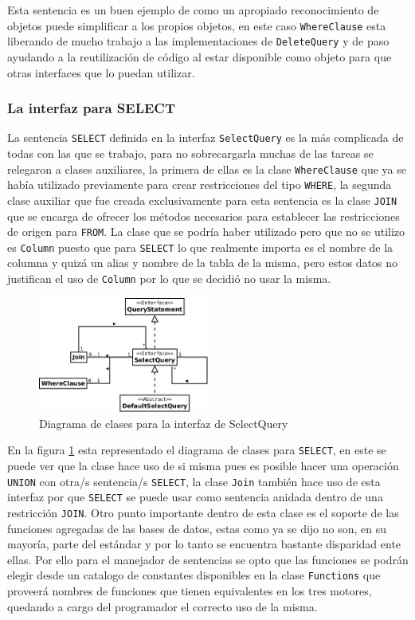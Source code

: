 Esta sentencia es un buen ejemplo de como un apropiado reconocimiento de objetos puede simplificar a los propios objetos, en este caso \verb=WhereClause= esta liberando de mucho trabajo a las implementaciones de \verb=DeleteQuery= y de paso ayudando a la reutilización de código al estar disponible como objeto para que otras interfaces que lo puedan utilizar.
%
\subsubsection{La interfaz para SELECT}
La sentencia \verb=SELECT= definida en la interfaz \verb=SelectQuery= es la más complicada de todas con las que se trabajo, para no sobrecargarla muchas de las tareas se relegaron  a clases auxiliares, la primera de ellas es la clase \verb=WhereClause= que ya se había utilizado previamente para crear restricciones del tipo \verb=WHERE=, la segunda clase auxiliar que fue creada exclusivamente para esta sentencia es la clase \verb=JOIN= que se encarga de ofrecer los métodos necesarios para establecer las restricciones de origen para  \verb=FROM=. La clase que se podría haber utilizado pero que no se utilizo es \verb=Column= puesto que para \verb=SELECT= lo que realmente importa es el nombre de la columna y quizá un alias y nombre de la tabla de la misma, pero estos datos no justifican el uso de \verb=Column= por lo que se decidió no usar la misma.
%
\begin{figure}[h]
  \centering
    \includegraphics[width=0.5\textwidth]{figuras/jdbgm-dc-select.png}
  \caption{Diagrama de clases para la interfaz de SelectQuery}
  \label{fig:dc-selectquery}
\end{figure}

En la figura \ref{fig:dc-selectquery} esta representado el diagrama de clases para \verb=SELECT=, en este se puede ver que la clase hace uso de si misma pues es posible hacer una operación \verb=UNION= con otra/s sentencia/s \verb=SELECT=, la clase \verb=Join= también hace uso de esta interfaz por que \verb=SELECT= se puede usar como sentencia anidada dentro de una restricción \verb=JOIN=. Otro punto importante dentro de esta clase es el soporte de las funciones agregadas de las bases de datos, estas como ya se dijo no son, en su mayoría, parte del estándar y por lo tanto se encuentra bastante disparidad ente ellas. Por ello para el manejador de sentencias se opto que las funciones se podrán elegir desde un catalogo de constantes disponibles en la clase \verb=Functions= que proveerá nombres de funciones que tienen equivalentes en los tres motores, quedando a cargo del programador el correcto uso de la misma.
%
